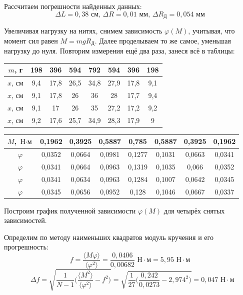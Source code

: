 \documentclass[a4paper, 12pt]{article} %
\begin{document}
Рассчитаем погрешности найденных данных:
\[\Delta L = 0,38\text{ см, }\Delta R = 0,01\text{ мм, }\Delta R_{\text{Д}} = 0,054\text{ мм}\]

Увеличивая нагрузку на нитях, снимем зависимость $\varphi (M)$, учитывая, что момент сил равен $M = mgR_{\text{Д}}$. Далее проделываем то же самое, уменьшая нагрузку до нуля. Повторим измерения ещё два раза, занеся всё в таблицы:

\begin{center}
\begin{tabular}{|c|c|c|c|c|c|c|c|}
\hline 
$m$, г & 198 & 396 & 594 & 792 & 594 & 396 & 198 \\ 
\hline 
$x$, см & 9,4 & 17,8 & 26,5 & 34,8 & 27,9 & 17,8 & 9,1 \\ 
\hline 
$x$, см & 9,1 & 17,8 & 26 & 36 & 28 & 17,7 & 9,4 \\ 
\hline 
$x$, см & 9,1 & 17 & 26 & 35 & 27,2 & 17,2 & 9,2 \\ 
\hline 
$x$, см & 9,2 & 17,6 & 25,7 & 34,9 & 28,3 & 17,9 & 9 \\ 
\hline 
\end{tabular} 
\end{center}

\begin{center}
\begin{tabular}{|c|c|c|c|c|c|c|c|}
\hline 
$M$, $\text{Н} \cdot \text{м}$ & 0,1962 & 0,3925 & 0,5887 & 0,785 & 0,5887 & 0,3925 & 0,1962 \\ 
\hline 
$\varphi$& 0,0352 & 0,0664 & 0,0981 & 0,1277 & 0,1031 & 0,0663 & 0,0341 \\ 
\hline 
$\varphi$& 0,0341 & 0,0664 & 0,0963 & 0,1319 & 0,1035 & 0,066 & 0,0352 \\ 
\hline 
$\varphi$& 0,0341 & 0,0634 & 0,0963 & 0,1284 & 0,1007 & 0,0642 & 0,0345 \\ 
\hline 
$\varphi$& 0,0345 & 0,0656 & 0,0952 & 0,128 & 0,1046 & 0,0667 & 0,0337 \\ 
\hline 
\end{tabular} 
\end{center}

Построим график полученной зависимости $\varphi (M)$ для четырёх снятых зависимостей. 

Определим по методу наименьших квадратов модуль кручения и его прогрешность:
\[f = \frac{\langle M  \varphi \rangle}{\langle \varphi^2 \rangle } = \frac{0,0406}{0,00682}\text{ Н} \cdot \text{м} = 5,95\text{ Н} \cdot \text{м}\]
\[\text{ } \Delta f = \sqrt{\frac{1}{N-1} \Big( \frac{\langle M^2 \rangle}{\langle \varphi^2 \rangle} - f^2 \Big)} = \sqrt{\frac{1}{27} \Big( \frac{0,242}{0,0273} - 2,974^2 \Big)} = 0,047\text{ Н} \cdot \text{м}\]
\end{document}
